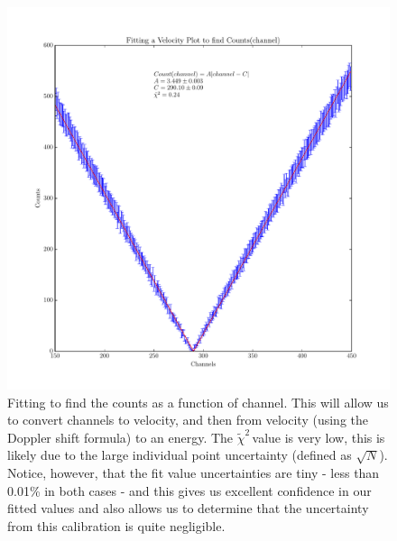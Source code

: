 \documentclass[reprint, nobibnotes, amssymb, amsmath, amsfonts, mathtools, mathrsfs, floatfix]{revtex4-1}
\newcommand{\redchi}{$\tilde{\chi}^2\,$}
\begin{document}
\begin{widetext}
      \begin{figure}[h]
        \centering
        \includegraphics[width=\linewidth]{../plots/velocity.pdf}
        \caption{Fitting to find the counts as a function of channel.  This will allow us to convert channels to velocity, and then from velocity (using the Doppler shift formula) to an energy.  The \redchi value is very low, this is likely due to the large individual point uncertainty (defined as $\sqrt{N}$).  Notice, however, that the fit value uncertainties are tiny - less than 0.01\% in both cases - and this gives us excellent confidence in our fitted values and also allows us to determine that the uncertainty from this calibration is quite negligible.~\label{velocity_plot}}
      \end{figure}


\end{widetext}
\end{document}
